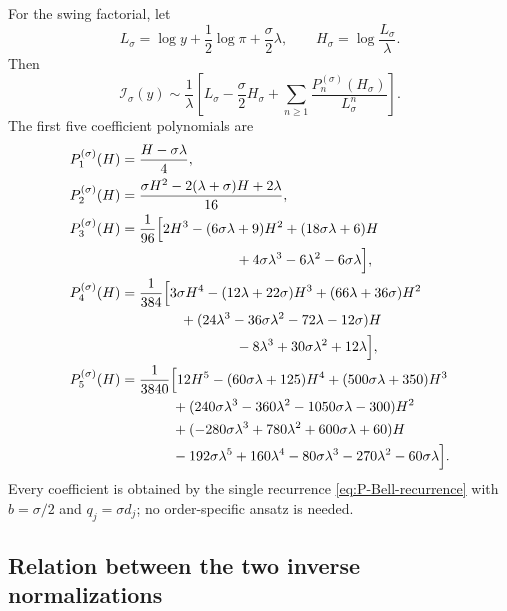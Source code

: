 \documentclass[11pt,a4paper]{article}
\numberwithin{equation}{section}
\theoremstyle{definition}
\theoremstyle{remark}
\begin{document}
For the swing factorial, let
\begin{equation}\label{eq:L-H-swing}
 L_\sigma=\log y+\frac12\log\pi+\frac\sigma2\lambda,
 \qquad H_\sigma=\log\frac{L_\sigma}{\lambda}.
\end{equation}
Then
\begin{equation}\label{eq:direct-swing-inverse}
 \boxed{\quad
 \mathcal I_\sigma(y)\sim\frac1\lambda\left[
 L_\sigma-\frac\sigma2H_\sigma
 +\sum_{n\ge1}\frac{P_n^{(\sigma)}(H_\sigma)}{L_\sigma^n}
 \right].\quad}
\end{equation}
The first five coefficient polynomials are
\begin{align}
 P_1^{(\sigma)}(H)
 &=\frac{H-\sigma\lambda}{4},\label{eq:P1-swing}\\
 P_2^{(\sigma)}(H)
 &=\frac{\sigma H^2-2(\lambda+\sigma)H+2\lambda}{16},
 \label{eq:P2-swing}\\
 P_3^{(\sigma)}(H)
 &=\frac1{96}\Bigl[
 2H^3-(6\sigma\lambda+9)H^2+(18\sigma\lambda+6)H\notag\\
 &\hspace{29mm}
 +4\sigma\lambda^3-6\lambda^2-6\sigma\lambda
 \Bigr],\label{eq:P3-swing}\\
 P_4^{(\sigma)}(H)
 &=\frac1{384}\Bigl[
 3\sigma H^4-(12\lambda+22\sigma)H^3
 +(66\lambda+36\sigma)H^2\notag\\
 &\hspace{15mm}
 +(24\lambda^3-36\sigma\lambda^2-72\lambda-12\sigma)H\notag\\
 &\hspace{29mm}
 -8\lambda^3+30\sigma\lambda^2+12\lambda
 \Bigr],\label{eq:P4-swing}\\
 P_5^{(\sigma)}(H)
 &=\frac1{3840}\Bigl[
 12H^5-(60\sigma\lambda+125)H^4
 +(500\sigma\lambda+350)H^3\notag\\
 &\hspace{13mm}
 +(240\sigma\lambda^3-360\lambda^2-1050\sigma\lambda-300)H^2\notag\\
 &\hspace{13mm}
 +(-280\sigma\lambda^3+780\lambda^2+600\sigma\lambda+60)H\notag\\
 &\hspace{13mm}
 -192\sigma\lambda^5+160\lambda^4-80\sigma\lambda^3
 -270\lambda^2-60\sigma\lambda
 \Bigr].\label{eq:P5-swing}
\end{align}
Every coefficient is obtained by the single recurrence
\cref{eq:P-Bell-recurrence} with \(b=\sigma/2\) and
\(q_j=\sigma d_j\); no order-specific ansatz is needed.

\subsection{Relation between the two inverse normalizations}
\end{document}
